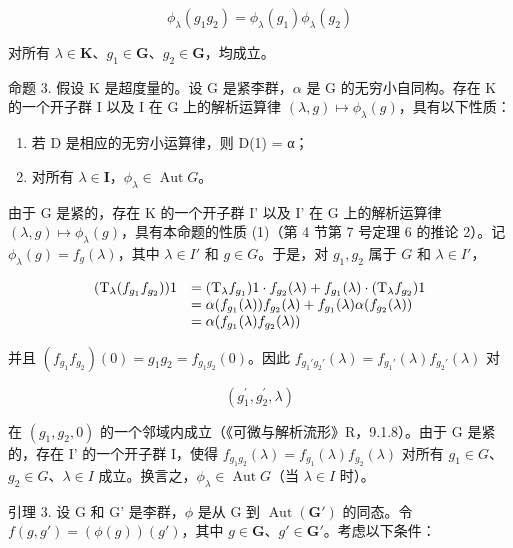 \[
\phi_ {\lambda} (g _ {1} g _ {2}) = \phi_ {\lambda} (g _ {1}) \phi_ {\lambda} (g _ {2})
\]

对所有 \(\lambda \in \mathbf{K}\)、\(g_{1} \in \mathbf{G}\)、\(g_{2} \in \mathbf{G}\)，均成立。

命题 3. 假设 K 是超度量的。设 G 是紧李群，\(\alpha\) 是 G 的无穷小自同构。存在 K 的一个开子群 I 以及 I 在 G 上的解析运算律 \((\lambda, g) \mapsto \phi_{\lambda}(g)\)，具有以下性质：

\begin{enumerate}
\def\labelenumi{(\arabic{enumi})}
\item
  若 D 是相应的无穷小运算律，则 D(1) = α；
\item
  对所有 \(\lambda \in \mathbf{I}\)，\(\phi_{\lambda} \in \operatorname{Aut} G\)。
\end{enumerate}

由于 G 是紧的，存在 K 的一个开子群 I' 以及 I' 在 G 上的解析运算律 \((\lambda, g) \mapsto \phi_{\lambda}(g)\)，具有本命题的性质 (1)（第 4 节第 7 号定理 6 的推论 2）。记 \(\phi_{\lambda}(g) = f_{g}(\lambda)\)，其中 \(\lambda \in I'\) 和 \(g \in G\)。于是，对 \(g_{1}, g_{2}\) 属于 \(G\) 和 \(\lambda \in I'\)，

\[
\begin{array}{r l} (\mathrm{T} _ {\lambda} (f _ {g _ {1}} f _ {g _ {2}})) 1 & = (\mathrm{T} _ {\lambda} f _ {g _ {1}}) 1 \cdot f _ {g _ {2}} (\lambda) + f _ {g _ {1}} (\lambda) \cdot (\mathrm{T} _ {\lambda} f _ {g _ {2}}) 1 \\ & = \alpha (f _ {g _ {1}} (\lambda)) f _ {g _ {2}} (\lambda) + f _ {g _ {1}} (\lambda) \alpha (f _ {g _ {2}} (\lambda)) \\ & = \alpha (f _ {g _ {1}} (\lambda) f _ {g _ {2}} (\lambda)) \end{array}
\]

并且 \((f_{g_1}f_{g_2})(0) = g_1g_2 = f_{g_1g_2}(0)\)。因此 \(f_{g_1'g_2'}(\lambda) = f_{g_1'}(\lambda)f_{g_2'}(\lambda)\) 对

\[
(g _ {1} ^ {\prime}, g _ {2} ^ {\prime}, \lambda)
\]

在 \((g_1, g_2, 0)\) 的一个邻域内成立（《可微与解析流形》R，9.1.8）。由于 G 是紧的，存在 I' 的一个开子群 I，使得 \(f_{g_1 g_2}(\lambda) = f_{g_1}(\lambda) f_{g_2}(\lambda)\) 对所有 \(g_1 \in G\)、\(g_2 \in G\)、\(\lambda \in I\) 成立。换言之，\(\phi_\lambda \in \operatorname{Aut} G\)（当 \(\lambda \in I\) 时）。

引理 3. 设 G 和 G' 是李群，\(\phi\) 是从 G 到 \(\operatorname{Aut}(\mathbf{G}')\) 的同态。令 \(f(g, g') = (\phi(g))(g')\)，其中 \(g \in \mathbf{G}\)、\(g' \in \mathbf{G}'\)。考虑以下条件：

